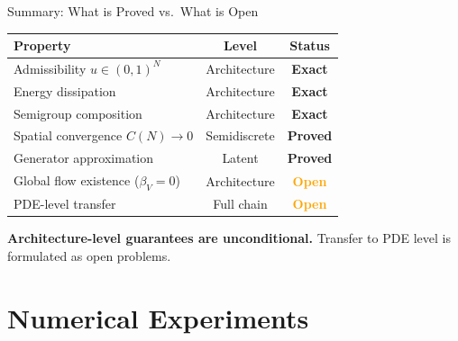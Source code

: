 \documentclass[aspectratio=169, 11pt]{beamer}
\begin{document}
\begin{frame}{Summary: What is Proved vs.\ What is Open}

\begin{center}
\begin{tabular}{lcc}
\toprule
\textbf{Property} & \textbf{Level} & \textbf{Status} \\
\midrule
Admissibility $u \in (0,1)^N$ & Architecture & \textcolor{green!60!black}{\textbf{Exact}} \\
Energy dissipation & Architecture & \textcolor{green!60!black}{\textbf{Exact}} \\
Semigroup composition & Architecture & \textcolor{green!60!black}{\textbf{Exact}} \\
Spatial convergence $C(N) \to 0$ & Semidiscrete & \textcolor{green!60!black}{\textbf{Proved}} \\
Generator approximation & Latent & \textcolor{green!60!black}{\textbf{Proved}} \\
Global flow existence ($\beta_V = 0$) & Architecture & \textcolor{orange}{\textbf{Open}} \\
PDE-level transfer & Full chain & \textcolor{orange}{\textbf{Open}} \\
\bottomrule
\end{tabular}
\end{center}

\vspace{0.2cm}
\centering
\textbf{Architecture-level guarantees are unconditional.}
Transfer to PDE level is formulated as open problems.
\end{frame}

\section{Numerical Experiments}
\end{document}
